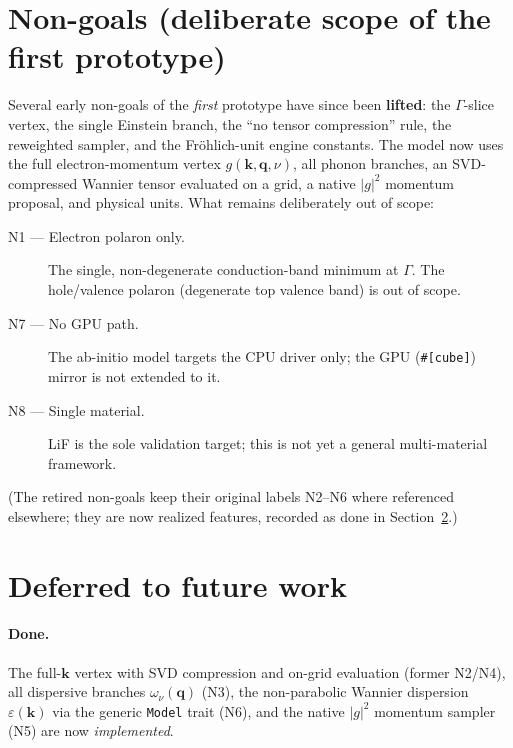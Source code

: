 \documentclass[11pt]{article}
\newcommand{\kv}{\mathbf{k}}
\newcommand{\qv}{\mathbf{q}}
\begin{document}
\section{Non-goals (deliberate scope of the first prototype)}
\label{sec:nongoals}

Several early non-goals of the \emph{first} prototype have since been \textbf{lifted}: the
$\Gamma$-slice vertex, the single Einstein branch, the ``no tensor compression'' rule, the
reweighted sampler, and the Fr\"ohlich-unit engine constants. The model now uses the full
electron-momentum vertex $g(\kv,\qv,\nu)$, all phonon branches, an SVD-compressed Wannier
tensor evaluated on a grid, a native $|g|^{2}$ momentum proposal, and physical units. What
remains deliberately out of scope:

\begin{description}
  \item[N1 --- Electron polaron only.] The single, non-degenerate conduction-band minimum
    at $\Gamma$. The hole/valence polaron (degenerate top valence band) is out of scope.

  \item[N7 --- No GPU path.] The ab-initio model targets the CPU driver only; the GPU
    (\texttt{\#[cube]}) mirror is not extended to it.

  \item[N8 --- Single material.] LiF is the sole validation target; this is not yet a
    general multi-material framework.
\end{description}

\noindent
(The retired non-goals keep their original labels N2--N6 where referenced elsewhere; they
are now realized features, recorded as done in Section~\ref{sec:deferred}.)

\section{Deferred to future work}
\label{sec:deferred}

\paragraph{Done.} The full-$\kv$ vertex with SVD compression and on-grid evaluation (former
N2/N4), all dispersive branches $\omega_{\nu}(\qv)$ (N3), the non-parabolic Wannier
dispersion $\varepsilon(\kv)$ via the generic \texttt{Model} trait (N6), and the native
$|g|^{2}$ momentum sampler (N5) are now \emph{implemented}.
\end{document}
